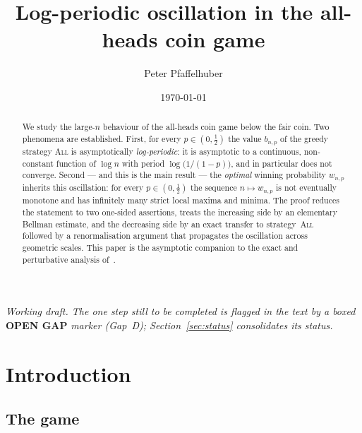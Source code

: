 \documentclass[11pt]{article}
\title{Log-periodic oscillation in the all-heads coin game}
\author{Peter Pfaffelhuber}
\date{\today}
\theoremstyle{definition}
\newcommand{\All}{\textsc{All}}
\begin{document}
\maketitle

\begin{abstract}
  We study the large-$n$ behaviour of the all-heads coin game below
  the fair coin. Two phenomena are established. First, for every
  $p\in(0,\tfrac12)$ the value $b_{n,p}$ of the greedy strategy
  \All{} is asymptotically \emph{log-periodic}: it is asymptotic to a
  continuous, non-constant function of $\log n$ with period
  $\log\bigl(1/(1-p)\bigr)$, and in particular does not converge.
  Second --- and this is the main result --- the \emph{optimal}
  winning probability $w_{n,p}$ inherits this oscillation: for every
  $p\in(0,\tfrac12)$ the sequence $n\mapsto w_{n,p}$ is not eventually
  monotone and has infinitely many strict local maxima and minima.
  The proof reduces the statement to two one-sided assertions, treats
  the increasing side by an elementary Bellman estimate, and the
  decreasing side by an exact transfer to strategy~\All{} followed by
  a renormalisation argument that propagates the oscillation across
  geometric scales. This paper is the asymptotic companion to the
  exact and perturbative analysis of~\cite{Paper1}.
\end{abstract}

\noindent\emph{\small Working draft. The one step still to be
completed is flagged in the text by a boxed}
{\small\bfseries\color{red!70!black}OPEN GAP} \emph{\small marker
(Gap~D); Section~\ref{sec:status} consolidates its status.}

\section{Introduction}\label{sec:intro}

\subsection{The game}
\end{document}
